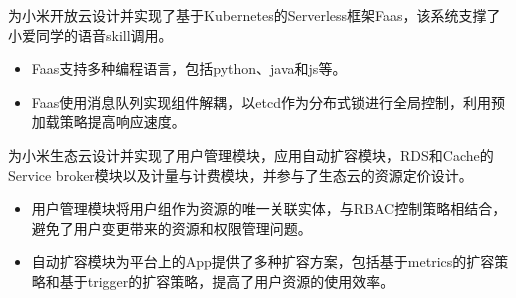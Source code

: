 \documentclass{resume}
\begin{document}
\begin{onehalfspacing}
为小米开放云设计并实现了基于Kubernetes的Serverless框架Faas，该系统支撑了小爱同学的语音skill调用。
\begin{itemize}
  \item Faas支持多种编程语言，包括python、java和js等。
  \item Faas使用消息队列实现组件解耦，以etcd作为分布式锁进行全局控制，利用预加载策略提高响应速度。
\end{itemize}
\end{onehalfspacing}



为小米生态云设计并实现了用户管理模块，应用自动扩容模块，RDS和Cache的Service broker模块以及计量与计费模块，并参与了生态云的资源定价设计。
\begin{itemize}
  \item 用户管理模块将用户组作为资源的唯一关联实体，与RBAC控制策略相结合，避免了用户变更带来的资源和权限管理问题。
  \item 自动扩容模块为平台上的App提供了多种扩容方案，包括基于metrics的扩容策略和基于trigger的扩容策略，提高了用户资源的使用效率。
\end{itemize}



\end{document}
